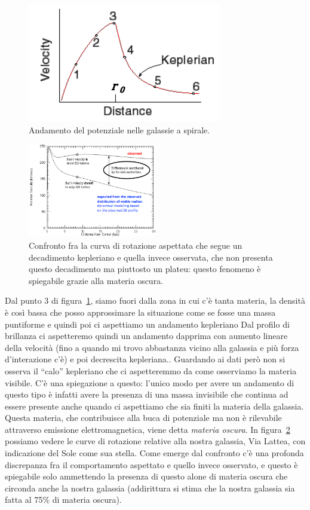 \begin{figure}
    \centering
    \includegraphics[width = 0.4 \textwidth]{immagini/potenziale-galassie-a-spirale.png}
    \caption{Andamento del potenziale nelle galassie a spirale.}
    \label{fig:potenziale-galassie-a-spirale}
\end{figure}

\begin{figure}
    \centering
    \includegraphics[width= 0.5\textwidth]{immagini/confronto-curve-di-rotazione.png}
    \caption{Confronto fra la curva di rotazione aspettata che segue un decadimento kepleriano e quella invece osservata, che non presenta questo decadimento ma piuttosto un plateu: questo fenomeno è spiegabile grazie alla materia oscura.}
    \label{fig:confronto-curve-di-rotazione}
\end{figure}

Dal punto 3 di figura~\ref{fig:potenziale-galassie-a-spirale}, siamo fuori dalla zona in cui c’è tanta materia, la densità è così bassa che posso approssimare la situazione come se fosse una massa puntiforme e quindi poi ci aspettiamo un andamento kepleriano Dal profilo di brillanza ci aspetteremo quindi un andamento dapprima con aumento lineare della velocità (fino a quando mi trovo abbastanza vicino alla galassia e più forza d'interazione c'è) e poi decrescita kepleriana.. Guardando ai dati però non si osserva il “calo” kepleriano che ci aspetteremmo da come osserviamo la materia visibile. C'è una spiegazione a questo: l'unico modo per avere un andamento di questo tipo è infatti avere la presenza di una massa invisibile che continua ad essere presente anche quando ci aspettiamo che sia finiti la materia della galassia. Questa materia, che contribuisce alla buca di potenziale ma non è rilevabile attraverso emissione elettromagnetica, viene detta \emph{materia oscura}. In figura~\ref{fig:confronto-curve-di-rotazione} possiamo vedere le curve di rotazione relative alla nostra galassia, Via Lattea, con indicazione del Sole come sua stella. Come emerge dal confronto c'è una profonda discrepanza fra il comportamento aspettato e quello invece osservato, e questo è spiegabile solo ammettendo la presenza di questo alone di materia oscura che circonda anche la nostra galassia (addirittura si stima che la nostra galassia sia fatta al 75\% di materia oscura).


